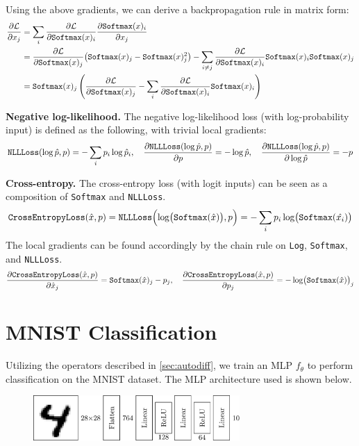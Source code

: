 \documentclass{lucas-report}
\begin{document}
Using the above gradients, we can derive a backpropagation rule in matrix form:
\[
  \begin{aligned}
    \pdv{\ensuremath{\mathcal{L}}}{x_j} & = \sum_i \pdv{\ensuremath{\mathcal{L}}}{\texttt{Softmax}(x)_i} \pdv{\texttt{Softmax}(x)_i}{x_j} \\
    & = \pdv{\ensuremath{\mathcal{L}}}{\texttt{Softmax}(x)_j} \bigl( \texttt{Softmax}(x)_j - \texttt{Softmax}(x)_j^2 \bigr)
    - \sum_{i \neq j } \pdv{\ensuremath{\mathcal{L}}}{\texttt{Softmax}(x)_i} \texttt{Softmax}(x)_i \texttt{Softmax}(x)_j \\
    & = \texttt{Softmax}(x)_j \left( \pdv{\ensuremath{\mathcal{L}}}{\texttt{Softmax}(x)_j} - \sum_i \pdv{\ensuremath{\mathcal{L}}}{\texttt{Softmax}(x)_i}\texttt{Softmax}(x)_i \right)
  \end{aligned}
\]

\textbf{Negative log-likelihood.} The negative log-likelihood loss (with log-probability input) is defined as the following,
with trivial local gradients:
\[
  \texttt{NLLLoss}(\log\hat{p}, p) = -\sum_i p_i \log \hat{p}_i, \quad
  \pdv{{\texttt{NLLLoss}(\log\hat{p}, p)}}{p} = -\log\hat{p}, \quad
  \pdv{{\texttt{NLLLoss}(\log\hat{p}, p)}}{\log\hat{p}} = -p
\]

\textbf{Cross-entropy.} The cross-entropy loss (with logit inputs) can be seen as a composition of \texttt{Softmax} and \texttt{NLLLoss}.
\[
  \texttt{CrossEntropyLoss}(\hat{x}, p) = \texttt{NLLLoss}\Bigl(\log\bigl(\texttt{Softmax}(\hat{x})\bigr), p\Bigr) = -\sum_i p_i \log \bigl(\texttt{Softmax}(\hat{x_i})\bigr)
\]
The local gradients can be found accordingly by the chain rule on \texttt{Log}, \texttt{Softmax}, and \texttt{NLLLoss}.
\[
  \begin{aligned}
    \pdv{\texttt{CrossEntropyLoss}(\hat{x}, p)}{\hat{x}_j} = \texttt{Softmax}(\hat{x})_j - p_j,
    \quad \pdv{\texttt{CrossEntropyLoss}(\hat{x}, p)}{p_j} = - \log \bigl( \texttt{Softmax}(\hat{x}) \bigr)_j
  \end{aligned}
\]

\section{MNIST Classification}

Utilizing the operators described in \autoref{sec:autodiff},
we train an MLP $f_\theta$ to perform classification on the MNIST dataset.
The MLP architecture used is shown below.
\begin{figure}[h]
  \centering
  \includegraphics[width=0.7\textwidth]{model.pdf}
\end{figure}
\end{document}
